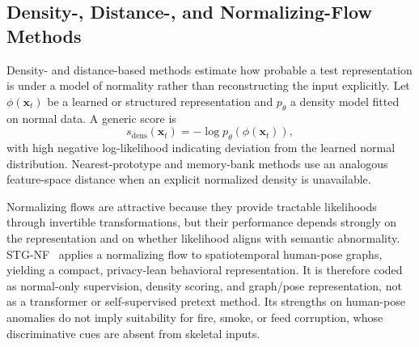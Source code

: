 \documentclass[10pt,a4paper]{article}
\renewcommand{\arraystretch}{1.12}
\begin{document}
\subsection{Density-, Distance-, and Normalizing-Flow Methods}
\label{subsec:density_flow}
Density- and distance-based methods estimate how probable a test representation is under a model of normality rather than reconstructing the input explicitly. Let $\phi(\mathbf{x}_t)$ be a learned or structured representation and $p_{\theta}$ a density model fitted on normal data. A generic score is
\begin{equation}
  s_{\mathrm{dens}}(\mathbf{x}_t)=-\log p_{\theta}\!\left(\phi(\mathbf{x}_t)\right), \label{eq:density_score}
\end{equation}
with high negative log-likelihood indicating deviation from the learned normal distribution. Nearest-prototype and memory-bank methods use an analogous feature-space distance when an explicit normalized density is unavailable.

Normalizing flows are attractive because they provide tractable likelihoods through invertible transformations, but their performance depends strongly on the representation and on whether likelihood aligns with semantic abnormality. STG-NF~\citep{hirschorn2023normalizing} applies a normalizing flow to spatiotemporal human-pose graphs, yielding a compact, privacy-lean behavioral representation. It is therefore coded as normal-only supervision, density scoring, and graph/pose representation, not as a transformer or self-supervised pretext method. Its strengths on human-pose anomalies do not imply suitability for fire, smoke, or feed corruption, whose discriminative cues are absent from skeletal inputs.

\begin{table}[!t]
\centering
\caption{Representative density- and distance-based evidence. Values are literature-reported frame-level AUC (\%) where available. Rows shared with other tables (MemAE, MNAD, STG-NF) are repeated for local reading convenience; the canonical consolidated comparison and provenance appear in Table~\ref{tab:consolidated_performance} and Supplementary Material~S4.}
\label{tab:density_methods}
\renewcommand{\arraystretch}{1.22}
\end{table}
\end{document}
